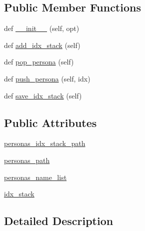 \subsection*{Public Member Functions}
\begin{DoxyCompactItemize}
\item 
def \hyperlink{classparlai_1_1mturk_1_1tasks_1_1convai2__model__eval_1_1worlds_1_1PersonasGenerator_aa0c6c8bdbf1e305073a4d9a32ac8dbe9}{\+\_\+\+\_\+init\+\_\+\+\_\+} (self, opt)
\item 
def \hyperlink{classparlai_1_1mturk_1_1tasks_1_1convai2__model__eval_1_1worlds_1_1PersonasGenerator_aa6d41d88d84d5db2a35a759e137da157}{add\+\_\+idx\+\_\+stack} (self)
\item 
def \hyperlink{classparlai_1_1mturk_1_1tasks_1_1convai2__model__eval_1_1worlds_1_1PersonasGenerator_aaed4bad803d218c5a11ffabae4fd4e66}{pop\+\_\+persona} (self)
\item 
def \hyperlink{classparlai_1_1mturk_1_1tasks_1_1convai2__model__eval_1_1worlds_1_1PersonasGenerator_a56726b1b104cbb5ab96a545fd64a917f}{push\+\_\+persona} (self, idx)
\item 
def \hyperlink{classparlai_1_1mturk_1_1tasks_1_1convai2__model__eval_1_1worlds_1_1PersonasGenerator_a73147a14066f719d65b627877cfa13f6}{save\+\_\+idx\+\_\+stack} (self)
\end{DoxyCompactItemize}
\subsection*{Public Attributes}
\begin{DoxyCompactItemize}
\item 
\hyperlink{classparlai_1_1mturk_1_1tasks_1_1convai2__model__eval_1_1worlds_1_1PersonasGenerator_a4d234fa06082edf35bb1554c1d52455b}{personas\+\_\+idx\+\_\+stack\+\_\+path}
\item 
\hyperlink{classparlai_1_1mturk_1_1tasks_1_1convai2__model__eval_1_1worlds_1_1PersonasGenerator_a3a1aee155f1499e76aeb9a3907a8ebf6}{personas\+\_\+path}
\item 
\hyperlink{classparlai_1_1mturk_1_1tasks_1_1convai2__model__eval_1_1worlds_1_1PersonasGenerator_ae6ffe35afe3d6d65219a048937249969}{personas\+\_\+name\+\_\+list}
\item 
\hyperlink{classparlai_1_1mturk_1_1tasks_1_1convai2__model__eval_1_1worlds_1_1PersonasGenerator_a09df2c36e5bfd5ece1815ae8e804fe03}{idx\+\_\+stack}
\end{DoxyCompactItemize}


\subsection{Detailed Description}


